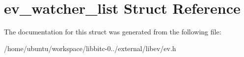 \hypertarget{structev__watcher__list}{\section{ev\-\_\-watcher\-\_\-list Struct Reference}
\label{structev__watcher__list}
}


The documentation for this struct was generated from the following file\-:\begin{DoxyCompactItemize}
\item 
/home/ubuntu/workspace/libbitc-\/0../external/libev/ev.\-h\end{DoxyCompactItemize}
